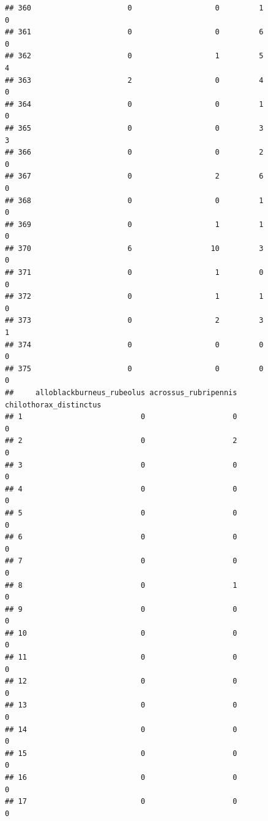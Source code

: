\documentclass[
]{article}
\begin{document}
\begin{verbatim}
## 360                      0                   0         1                  0
## 361                      0                   0         6                  0
## 362                      0                   1         5                  4
## 363                      2                   0         4                  0
## 364                      0                   0         1                  0
## 365                      0                   0         3                  3
## 366                      0                   0         2                  0
## 367                      0                   2         6                  0
## 368                      0                   0         1                  0
## 369                      0                   1         1                  0
## 370                      6                  10         3                  0
## 371                      0                   1         0                  0
## 372                      0                   1         1                  0
## 373                      0                   2         3                  1
## 374                      0                   0         0                  0
## 375                      0                   0         0                  0
##     alloblackburneus_rubeolus acrossus_rubripennis chilothorax_distinctus
## 1                           0                    0                      0
## 2                           0                    2                      0
## 3                           0                    0                      0
## 4                           0                    0                      0
## 5                           0                    0                      0
## 6                           0                    0                      0
## 7                           0                    0                      0
## 8                           0                    1                      0
## 9                           0                    0                      0
## 10                          0                    0                      0
## 11                          0                    0                      0
## 12                          0                    0                      0
## 13                          0                    0                      0
## 14                          0                    0                      0
## 15                          0                    0                      0
## 16                          0                    0                      0
## 17                          0                    0                      0

\end{verbatim}
\end{document}
